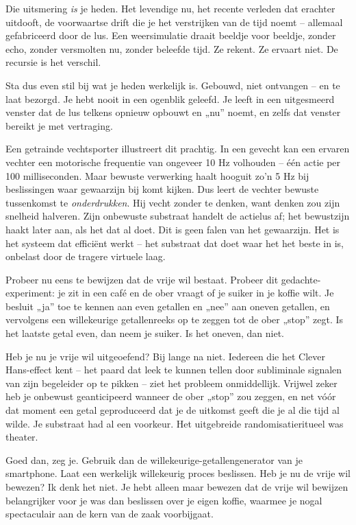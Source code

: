 \documentclass[11pt, twoside, openright]{book}
\begin{document}
Die uitsmering \textit{is} je heden. Het levendige nu, het recente verleden dat erachter uitdooft, de voorwaartse drift die je het verstrijken van de tijd noemt -- allemaal gefabriceerd door de lus. Een weersimulatie draait beeldje voor beeldje, zonder echo, zonder versmolten nu, zonder beleefde tijd. Ze rekent. Ze ervaart niet. De recursie is het verschil.

Sta dus even stil bij wat je heden werkelijk is. Gebouwd, niet ontvangen -- en te laat bezorgd. Je hebt nooit in een ogenblik geleefd. Je leeft in een uitgesmeerd venster dat de lus telkens opnieuw opbouwt en „nu” noemt, en zelfs dat venster bereikt je met vertraging.

Een getrainde vechtsporter illustreert dit prachtig. In een gevecht kan een ervaren vechter een motorische frequentie van ongeveer 10 Hz volhouden -- één actie per 100 milliseconden. Maar bewuste verwerking haalt hooguit zo’n 5 Hz bij beslissingen waar gewaarzijn bij komt kijken. Dus leert de vechter bewuste tussenkomst te \textit{onderdrukken}. Hij vecht zonder te denken, want denken zou zijn snelheid halveren. Zijn onbewuste substraat handelt de actielus af; het bewustzijn haakt later aan, als het dat al doet. Dit is geen falen van het gewaarzijn. Het is het systeem dat efficiënt werkt -- het substraat dat doet waar het het beste in is, onbelast door de tragere virtuele laag.

Probeer nu eens te bewijzen dat de vrije wil bestaat. Probeer dit gedachte-experiment: je zit in een café en de ober vraagt of je suiker in je koffie wilt. Je besluit „ja” toe te kennen aan even getallen en „nee” aan oneven getallen, en vervolgens een willekeurige getallenreeks op te zeggen tot de ober „stop” zegt. Is het laatste getal even, dan neem je suiker. Is het oneven, dan niet.

Heb je nu je vrije wil uitgeoefend? Bij lange na niet. Iedereen die het Clever Hans-effect kent -- het paard dat leek te kunnen tellen door subliminale signalen van zijn begeleider op te pikken -- ziet het probleem onmiddellijk. Vrijwel zeker heb je onbewust geanticipeerd wanneer de ober „stop” zou zeggen, en net vóór dat moment een getal geproduceerd dat je de uitkomst geeft die je al die tijd al wilde. Je substraat had al een voorkeur. Het uitgebreide randomisatieritueel was theater.

Goed dan, zeg je. Gebruik dan de willekeurige-getallengenerator van je smartphone. Laat een werkelijk willekeurig proces beslissen. Heb je nu de vrije wil bewezen? Ik denk het niet. Je hebt alleen maar bewezen dat de vrije wil bewijzen belangrijker voor je was dan beslissen over je eigen koffie, waarmee je nogal spectaculair aan de kern van de zaak voorbijgaat.
\end{document}
